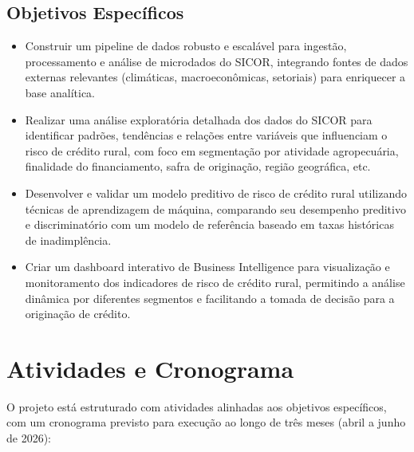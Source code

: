 \subsection{Objetivos Específicos}

\begin{itemize}
    \item[\textbf{OE1:}] Construir um pipeline de dados robusto e escalável para ingestão, processamento e análise de microdados do SICOR, integrando fontes de dados externas relevantes (climáticas, macroeconômicas, setoriais) para enriquecer a base analítica.
    \item[\textbf{OE2:}] Realizar uma análise exploratória detalhada dos dados do SICOR para identificar padrões, tendências e relações entre variáveis que influenciam o risco de crédito rural, com foco em segmentação por atividade agropecuária, finalidade do financiamento, safra de originação, região geográfica, etc.
    \item[\textbf{OE3:}] Desenvolver e validar um modelo preditivo de risco de crédito rural utilizando técnicas de aprendizagem de máquina, comparando seu desempenho preditivo e discriminatório com um modelo de referência baseado em taxas históricas de inadimplência.
    \item[\textbf{OE4:}] Criar um dashboard interativo de Business Intelligence para visualização e monitoramento dos indicadores de risco de crédito rural, permitindo a análise dinâmica por diferentes segmentos e facilitando a tomada de decisão para a originação de crédito.
\end{itemize}

\section{Atividades e Cronograma}

O projeto está estruturado com atividades alinhadas aos objetivos específicos, com um cronograma previsto para execução ao longo de três meses (abril a junho de 2026):

